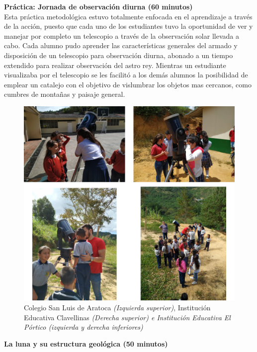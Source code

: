 \documentclass[a4paper,10pt]{article}
\begin{document}
\noindent \textbf{Práctica: Jornada de observación diurna (60 minutos)}\\

\noindent Esta práctica metodológica estuvo totalmente enfocada en el aprendizaje a través de la acción, puesto que cada uno de los estudiantes tuvo la oportunidad de ver y manejar por completo un telescopio a través de la observación solar llevada a cabo. Cada alumno pudo aprender las características generales del armado y disposición de un telescopio para observación diurna, abonado a un tiempo extendido para realizar observación del astro rey. Mientras un estudiante visualizaba por el telescopio se les facilitó a los demás alumnos la posibilidad de emplear un catalejo con el objetivo de vislumbrar los objetos mas cercanos, como cumbres de montañas y paisaje general.\\

\begin{figure}[H]
    \centering
    \includegraphics[width=12cm]{J-S/solar.png}
    \caption{Colegio San Luis de Aratoca \textit{(Izquierda superior)}, Institución Educativa Clavellinas \textit{(Derecha superior) e Institución Educativa El Pórtico (izquierda y derecha inferiores)}}
    \label{fig: solar}
\end{figure}


\noindent \textbf{La luna y su estructura geológica (50 minutos)}\\
\end{document}
